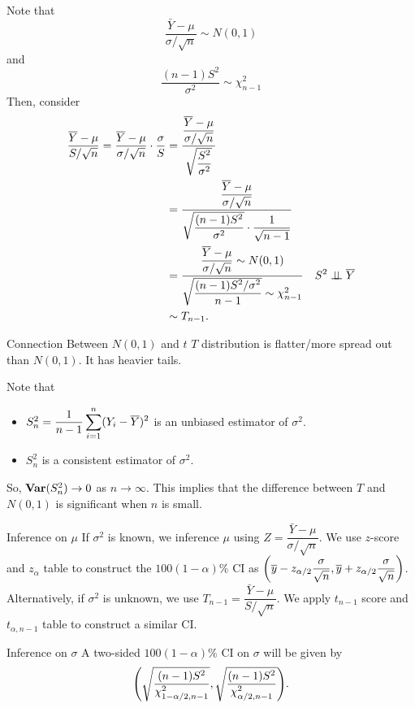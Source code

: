 \begin{prf}
	Note that \begin{equation}\label{eq2}\dfrac{\bar Y-\mu}{\sigma/\sqrt{n}}\sim N(0,1)\end{equation} and \begin{equation}\label{eq3}\dfrac{(n-1)S^2}{\sigma^2}\sim\chi_{n-1}^2\end{equation} Then, consider \begin{align*}\dfrac{\overline Y-\mu}{S/\sqrt{n}}=\dfrac{\overline Y-\mu}{\sigma/\sqrt{n}}\cdot\dfrac{\sigma}{S}&=\dfrac{\dfrac{\overline Y-\mu}{\sigma/\sqrt{n}}}{\sqrt{\dfrac{S^2}{\sigma^2}}}\\&=\dfrac{\dfrac{\overline Y-\mu}{\sigma/\sqrt{n}}}{\sqrt{\dfrac{(n-1)S^2}{\sigma^2}}\cdot\dfrac{1}{\sqrt{n-1}}}\\&=\dfrac{\dfrac{\overline Y-\mu}{\sigma/\sqrt{n}}\sim N(0,1)}{\sqrt{\dfrac{(n-1)S^2/\sigma^2}{n-1}}\sim\chi_{n-1}^2}&S^2\perp\!\!\!\perp\overline Y\\&\sim T_{n-1}.\end{align*}
\end{prf}
\begin{thm}{Connection Between $N(0,1)$ and $t$}
	$T$ distribution is flatter/more spread out than $N(0,1)$. It has heavier tails. 	
\end{thm}
\begin{prf}
	Note that \begin{itemize}
		\item $S_n^2=\dfrac{1}{n-1}\displaystyle\sum_{i=1}^n(Y_i-\overline Y)^2$ is an unbiased estimator of $\sigma^2$.
		\item $S_n^2$ is a consistent estimator of $\sigma^2$.
	\end{itemize}
	So, $\vb{Var}(S_n^2)\to0$ as $n\to\infty$. This implies that the difference between $T$ and $N(0,1)$ is significant when $n$ is small. 
\end{prf}
\begin{thm}{Inference on $\mu$}
	If $\sigma^2$ is known, we inference $\mu$ using $Z=\dfrac{\bar Y-\mu}{\sigma/\sqrt{n}}$. We use $z$-score and $z_\alpha$ table to construct the $100(1-\alpha)\%$ CI as $\qty(\overline y-z_{\alpha/2}\dfrac{\sigma}{\sqrt{n}},\overline y+z_{\alpha/2}\dfrac{\sigma}{\sqrt{n}})$. Alternatively, if $\sigma^2$ is unknown, we use $T_{n-1}=\dfrac{\bar Y-\mu}{S/\sqrt{n}}$. We apply $t_{n-1}$ score and $t_{\alpha,n-1}$ table to construct a similar CI.
\end{thm}
\begin{thm}{Inference on $\sigma$}
	A two-sided $100(1-\alpha)\%$ CI on $\sigma$ will be given 	by \[\qty(\sqrt{\dfrac{(n-1)S^2}{\chi_{1-\alpha/2,n-1}^2}},\sqrt{\dfrac{(n-1)S^2}{\chi_{\alpha/2,n-1}^2}}).\]
\end{thm}
